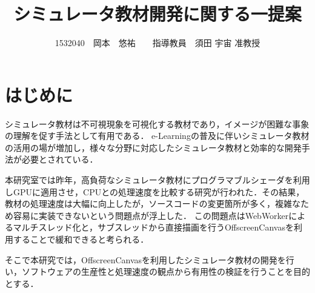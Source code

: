 \documentclass[twocolumn,10pt,a4j]{jsarticle}
\title{シミュレータ教材開発に関する一提案}
\author{1532040　岡本　悠祐　　指導教員　須田 宇宙 准教授}
\date{}
\begin{document}
\maketitle
\section{はじめに}
シミュレータ教材は不可視現象を可視化する教材であり，イメージが困難な事象の理解を促す手法として有用である．
e-Learningの普及に伴いシミュレータ教材の活用の場が増加し，様々な分野に対応したシミュレータ教材と効率的な開発手法が必要とされている．

本研究室では昨年，高負荷なシミュレータ教材にプログラマブルシェーダを利用しGPUに適用させ，CPUとの処理速度を比較する研究が行われた\cite{book}．その結果，教材の処理速度は大幅に向上したが，ソースコードの変更箇所が多く，複雑なため容易に実装できないという問題点が浮上した．
この問題点はWebWorkerによるマルチスレッド化と，サブスレッドから直接描画を行うOffscreenCanvasを利用することで緩和できると考られる．

そこで本研究では，OffscreenCanvasを利用したシミュレータ教材の開発を行い，ソフトウェアの生産性と処理速度の観点から有用性の検証を行うことを目的とする．
\end{document}
